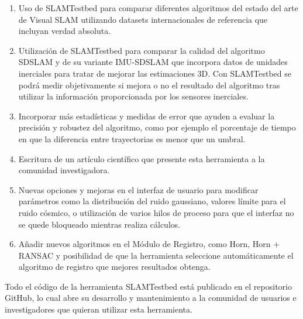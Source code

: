 \begin{enumerate}

\item{Uso de SLAMTestbed para comparar diferentes algoritmos del estado del arte de Visual SLAM utilizando datasets internacionales de referencia que incluyan verdad absoluta.}


\item{Utilización de SLAMTestbed para comparar la calidad del algoritmo SDSLAM y de su variante IMU-SDSLAM que incorpora datos de unidades inerciales para tratar de mejorar las estimaciones 3D. Con SLAMTestbed se podrá medir objetivamente si mejora o no el resultado del algoritmo tras utilizar la información proporcionada por los sensores inerciales.}

\item{Incorporar más estadísticas y medidas de error que ayuden a evaluar la precisión y robustez del algoritmo, como por ejemplo el porcentaje de tiempo en que la diferencia entre trayectorias es menor que un umbral.}

\item{Escritura de un artículo científico que presente esta herramienta a la comunidad investigadora.}

\item{Nuevas opciones y mejoras en el interfaz de usuario para modificar parámetros como la distribución del ruido gaussiano, valores límite para el ruido cósmico, o utilización de varios hilos de proceso para que el interfaz no se quede bloqueado mientras realiza cálculos.}

\item{Añadir nuevos algoritmos en el Módulo de Registro, como Horn, Horn + RANSAC y posibilidad de que la herramienta seleccione automáticamente el algoritmo de registro que mejores resultados obtenga.}


\end{enumerate}

Todo el código de la herramienta SLAMTestbed está publicado en el repositorio GitHub, lo cual abre su desarrollo y mantenimiento a la comunidad de usuarios e investigadores que quieran utilizar esta herramienta.


